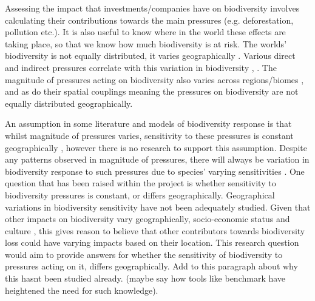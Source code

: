 \documentclass[11pt, a4paper, titlepage]{article}
\begin{document}
   	 Assessing the impact that investments/companies have on biodiversity involves calculating their contributions towards the main pressures (e.g. deforestation, pollution etc.). It is also useful to know where in the world these effects are taking place, so that we know how much biodiversity is at risk. The worlds' biodiversity is not equally distributed, it varies geographically \citep{gaston2000global} \citep{ricklefs2004comprehensive} \citep{mcrae2017diversity}. Various direct and indirect pressures correlate with this variation in biodiversity \citep{sunday2015species}, \citep{ament2019compatibility} \citep{Velde2022}. The magnitude of pressures acting on biodiversity also varies across regions/biomes \citep{millennium2005ecosystems} \citep{sala2000global}, and as do their spatial couplings \citep{bowler2020mapping} meaning the pressures on biodiversity are not equally distributed geographically. \newline
   	 
   	 An assumption in some literature and models of biodiversity response is that whilst magnitude of pressures varies, sensitivity to these pressures is constant geographically \citep{sala2000global}, however there is no research to support this assumption. Despite any patterns observed in magnitude of pressures, there will always be variation in biodiversity response to such pressures due to species' varying sensitivities \citep{bowler2020mapping}. One question that has been raised within the project is whether sensitivity to biodiversity pressures is constant, or differs geographically. Geographical variations in biodiversity sensitivity have not been adequately studied. Given that other impacts on biodiversity vary geographically, socio-economic status and culture  \citep{kinzig2005effects}, this gives reason to believe that other contributors towards biodiversity loss could have varying impacts based on their location. This research question would aim to provide answers for whether the sensitivity of biodiversity to pressures acting on it, differs geographically. Add to this paragraph about why this hasnt been studied already. (maybe say how tools like benchmark have heightened the need for such knowledge). \newline
   	 
\end{document}
